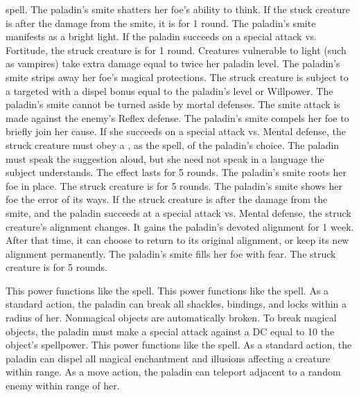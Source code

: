 spell.
The paladin's smite shatters her foe's ability to think.
If the stuck creature is \bloodied after the damage from the smite, it is \dazed for 1 round.
The paladin's smite manifests as a bright light.
If the paladin succeeds on a special attack vs. Fortitude, the struck creature is \blinded for 1 round.
Creatures vulnerable to light (such as vampires) take extra damage equal to twice her paladin level.
The paladin's smite strips away her foe's magical protections.
The struck creature is subject to a targeted  with a dispel bonus equal to the paladin's level or Willpower.
The paladin's smite cannot be turned aside by mortal defenses.
The smite attack is made against the enemy's Reflex defense.
The paladin's smite compels her foe to briefly join her cause.
If she succeeds on a special attack vs. Mental defense, the struck creature must obey a , as the spell, of the paladin's choice.
The paladin must speak the suggestion aloud, but she need not speak in a language the subject understands.
The effect lasts for 5 rounds.
The paladin's smite roots her foe in place.
The struck creature is \immobilized for 5 rounds.
The paladin's smite shows her foe the error of its ways.
If the struck creature is \bloodied after the damage from the smite, and the paladin succeeds at a special attack vs. Mental defense, the struck creature's alignment changes.
It gains the paladin's devoted alignment for 1 week.
After that time, it can choose to return to its original alignment, or keep its new alignment permanently.
The paladin's smite fills her foe with fear.
The struck creature is \frightened for 5 rounds.

 This power functions like the 
spell.
 This power functions like the 
spell.
As a standard action, the paladin can break all shackles, bindings, and locks within a \arealarge radius of her.
Nonmagical objects are automatically broken.
To break magical objects, the paladin must make a special attack against a DC equal to 10 \add the object's spellpower.
 This power functions like the 
spell.
As a standard action, the paladin can dispel all magical enchantment and illusions affecting a creature within \rngmed range.
As a move action, the paladin can teleport adjacent to a random enemy within \rngmed range of her.

